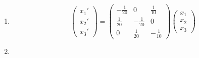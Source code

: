 \documentclass{article}
\begin{document}
\begin{enumerate}
  \item \[\begin{pmatrix}
            x_1' \\
            x_2' \\
            x_3'
          \end{pmatrix} = \begin{pmatrix}
            -\frac{1}{20} & 0             & \frac{1}{10}  \\
            \frac{1}{20}  & -\frac{1}{20} & 0             \\
            0             & \frac{1}{20}  & -\frac{1}{10}
          \end{pmatrix} \begin{pmatrix}
            x_1 \\
            x_2 \\
            x_3
          \end{pmatrix}\]

  \item


\end{enumerate}
\end{document}
